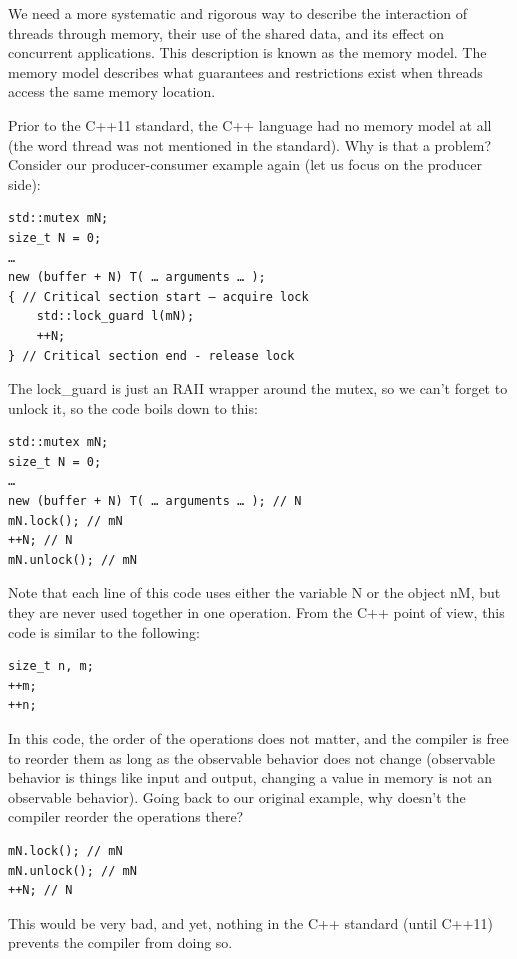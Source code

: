 We need a more systematic and rigorous way to describe the interaction of threads through memory, their use of the shared data, and its effect on concurrent applications. This description is known as the memory model. The memory model describes what guarantees and restrictions exist when threads access the same memory location.

Prior to the C++11 standard, the C++ language had no memory model at all (the word thread was not mentioned in the standard). Why is that a problem? Consider our producer-consumer example again (let us focus on the producer side):

\begin{lstlisting}[style=styleCXX]
std::mutex mN;
size_t N = 0;
…
new (buffer + N) T( … arguments … );
{ // Critical section start – acquire lock
	std::lock_guard l(mN);
	++N;
} // Critical section end - release lock
\end{lstlisting}

The lock\_guard is just an RAII wrapper around the mutex, so we can't forget to unlock it, so the code boils down to this:

\begin{lstlisting}[style=styleCXX]
std::mutex mN;
size_t N = 0;
…
new (buffer + N) T( … arguments … ); // N
mN.lock(); // mN
++N; // N
mN.unlock(); // mN
\end{lstlisting}

Note that each line of this code uses either the variable N or the object nM, but they are never used together in one operation. From the C++ point of view, this code is similar to the following:

\begin{lstlisting}[style=styleCXX]
size_t n, m;
++m;
++n;
\end{lstlisting}

In this code, the order of the operations does not matter, and the compiler is free to reorder them as long as the observable behavior does not change (observable behavior is things like input and output, changing a value in memory is not an observable behavior). Going back to our original example, why doesn't the compiler reorder the operations there?

\begin{lstlisting}[style=styleCXX]
mN.lock(); // mN
mN.unlock(); // mN
++N; // N
\end{lstlisting}

This would be very bad, and yet, nothing in the C++ standard (until C++11) prevents the compiler from doing so.

